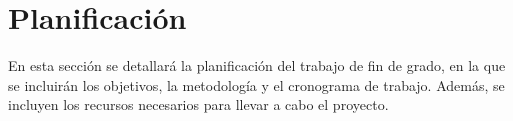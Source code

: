 \section{Planificación}
En esta sección se detallará la planificación del trabajo de fin de grado, en la que se incluirán los objetivos, la metodología y el cronograma de trabajo. Además, se incluyen los recursos necesarios para llevar a cabo el proyecto.


